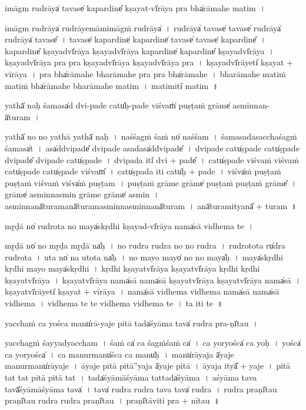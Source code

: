 \documentclass[parskip, DIV=14]{scrartcl}
\begin{document}
{i॒māgm ru॒drāya̍ ta॒vase̍ kapa॒rdine̎ kṣa॒yat-vī̍rāya॒ pra bha̍rāmahe ma॒tim~।

i॒māgm ru॒drāya̍ ru॒drāye॒māmi॒māgṁ ru॒drāya̍~।
ru॒drāya̍ ta॒vase̍ ta॒vase̍ ru॒drāya̍ ru॒drāya̍ ta॒vase̎~।
ta॒vase̍ kapa॒rdine̍ kapa॒rdine̍ ta॒vase̍ ta॒vase̍ kapa॒rdine̎~।
ka॒pa॒rdine̎ kṣa॒yadvī̍rāya kṣa॒yadvī̍rāya kapa॒rdine̍ kapa॒rdine̎ kṣa॒yadvī̍rāya~।
kṣa॒yadvī̍rāya॒ pra pra kṣa॒yadvī̍rāya kṣa॒yadvī̍rāya॒ pra~।
kṣa॒yadvī̍rā॒yeti̍ kṣa॒yat + vī॒rā॒ya॒~।
pra bha̍rāmahe bharāmahe॒ pra pra bha̍rāmahe~।
bha॒rā॒ma॒he॒ ma॒tiṁ ma॒tiṁ bha̍rāmahe bharāmahe ma॒tim~।
ma॒timiti̍ ma॒tim~॥ 

yathā̍ na॒ḥ śamasa̍d dvi॒-pade॒ catu̍ḥ-pade॒ viśvaṁ̍ pu॒ṣṭaṁ grāme̍ a॒sminnan-ā̍turam~।

yathā̍ no no॒ yathā॒ yathā̍ naḥ~।
na॒śśagṁ śaṁ no̍ na॒śśam~।
śamasa॒dasa॒cchaśagṁ śamasa̍t~।
asa̍ddvi॒pade̎ dvi॒pade॒ asa॒dasa̍ddvi॒pade̎~।
dvi॒pade॒ catu̍ṣpade॒ catu̍ṣpade dvi॒pade̎ dvi॒pade॒ catu̍ṣpade~।
dvi॒pada॒ iti̍ dvi + pade̎~।
catu̍ṣpade॒ viśva॒ṁ viśva॒ṁ catu̍ṣpade॒ catu̍ṣpade॒ viśvam̎~।
catu̍ṣpada॒ iti॒ catu̍ḥ + pa॒de॒~।
viśva̍ṁ pu॒ṣṭaṁ pu॒ṣṭaṁ viśva॒ṁ viśva̍ṁ pu॒ṣṭam~।
pu॒ṣṭaṁ grāme॒ grāme̍ pu॒ṣṭaṁ pu॒ṣṭaṁ grāme̎~।
grāme̍ a॒sminna॒smin grāme॒ grāme̍ a॒smin~।
a॒sminnanā̍tura॒manā̍turama॒sminna॒sminnanā̍turam~।
anā̍tura॒mityanā̎ + tu॒ra॒m~॥ 

mṛ̱ḍā no̍ rudro॒ta no॒ maya̍skṛdhi kṣa॒yad-vī̍rāya॒ nama̍sā vidhema te~।

mṛ̱ḍā no̍ no mṛ̱ḍa mṛ̱ḍā na̍ḥ~।
no॒ ru॒dra॒ ru॒dra॒ no॒ no॒ ru॒dra॒~।
ru॒dro॒tota ru̍dra rudro॒ta~।
u॒ta no̍ na u॒tota na̍ḥ~।
no॒ mayo॒ mayo̍ no no॒ maya̍ḥ~।
maya̍skṛdhi kṛdhi॒ mayo॒ maya̍skṛdhi~।
kṛ॒dhi॒ kṣa॒yatvī̍rāya kṣa॒yatvī̍rāya kṛdhi  kṛdhi kṣa॒yatvī̍rāya~।
kṣa॒yatvī̍rāya॒ nama̍sā॒ nama̍sā kṣa॒yatvī̍rāya kṣa॒yatvī̍rāya॒ nama̍sā~।
kṣa॒yatvī̍rā॒yeti̍ kṣa॒yat + vī॒rā॒ya॒~।
nama̍sā vidhema vidhema॒ nama̍sā॒ nama̍sā vidhema~।
vi॒dhe॒ma॒ te॒ te॒ vi॒dhe॒ma॒ vi॒dhe॒ma॒ te॒~।
ta॒ iti te~॥ 

yacchaṁ ca॒ yośca॒ manu̍rā-ya॒je pi॒tā tada̍śyāma॒ tava̍ rudra॒ pra-ṇī̍tau~।

yacchagṁ śayyadyaccham~।
śaṁ ca̍ ca॒ śagṁśaṁ ca̍~।
ca॒ yoryośca̍ ca॒ yoḥ~।
yośca̍ ca॒ yoryośca̍~।
ca॒ manu॒rmanu̍śca ca॒ manu̍ḥ~।
manu̍rāya॒ja ā̍ya॒je manu॒rmanu̍rāya॒je~।
ā॒ya॒je pi॒tā pi॒tā''ya॒ja ā̍ya॒je pi॒tā~।
ā॒ya॒ja ityā̎ + ya॒je~।
pi॒tā tat tat pi॒tā pi॒tā tat~।
tada̍śyāmāśyāma॒ tattada̍śyāma~।
a॒śyā॒ma॒ tava॒ tavā̎śyāmāśyāma॒ tava̍~।
tava̍ rudra rudra॒ tava॒ tava̍ rudra~।
ru॒dra॒ praṇī̍tau॒ praṇī̍tau rudra rudra॒ praṇī̍tau~।
praṇī̍tā॒viti॒ pra + nī॒tau॒~॥ 

}
\end{document}
